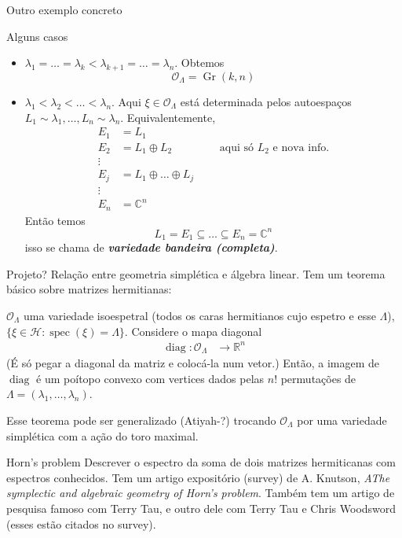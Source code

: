\begin{thing6}{Outro exemplo concreto}
\begin{thing3}{Alguns casos}
\begin{itemize}
	\item $\lambda_1=\ldots =\lambda_k<\lambda_{k+1}=\ldots =\lambda_n$. Obtemos
		\[\mathcal{O}_\Lambda=\operatorname{Gr}(k,n)\]
	\item $\lambda_1<\lambda_2<\ldots <\lambda_n$. Aqui $\xi \in\mathcal{O}_\Lambda$ está determinada pelos autoespaços $L_1\sim\lambda_1,\ldots,L_n\sim\lambda_n$. Equivalentemente,
		\begin{align*}
			E_1&=L_1\\
			E_2&=L_1\oplus L_2\qquad \qquad \text{ aqui só $L_2$ e nova info.}\\
			\vdots \\
			E_j&=L_1\oplus \ldots \oplus L_j\\
			\vdots \\
			E_n&=\mathbb{C}^n
		\end{align*}
		Então temos
		 \[L_1=E_1\subseteq\ldots \subseteq E_n=\mathbb{C}^{n}\]
		isso se chama de \textit{\textbf{variedade bandeira (completa)}}.
	\end{itemize}
\end{thing3}
\end{thing6}

\begin{thing1}{Projeto?}\leavevmode
	Relação entre geometria simplética e álgebra linear. Tem um teorema básico sobre matrizes hermitianas:
	\begin{thm}\leavevmode
		$\mathcal{O}_\Lambda$ uma variedade isoespetral (todos os caras hermitianos cujo espetro e esse $\Lambda$), $\{\xi \in\mathcal{H}:\operatorname{s pec}(\xi)=\Lambda\}$.
		Considere o mapa diagonal
		\begin{align*}
			\operatorname{diag}: \mathcal{O}_\Lambda &\longrightarrow \mathbb{R}^{n}
		\end{align*}
		(É só pegar a diagonal da matriz e colocá-la num vetor.) Então, a imagem de $\operatorname{diag}$ é um poítopo convexo com vertices dados pelas $n!$ permutações  de $\Lambda=(\lambda_1,\ldots,\lambda_n)$.
	\end{thm}
	\begin{remark}
		Esse teorema pode ser generalizado (Atiyah-?) trocando $\mathcal{O}_\Lambda$ por uma variedade simplética com a ação do toro maximal.
	\end{remark}
	\begin{thing3}{Horn's problem}\leavevmode
		Descrever o espectro da soma de dois matrizes hermiticanas com espectros conhecidos. Tem um artigo expositório (survey) de A. Knutson, \textit{AThe symplectic and algebraic geometry of Horn's problem}. Também tem um artigo de pesquisa famoso com Terry Tau, e outro dele com Terry Tau e Chris Woodsword (esses estão citados no survey).
	\end{thing3}
\end{thing1}

